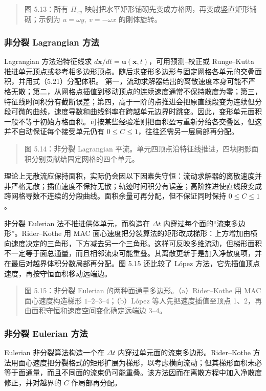 \documentclass[11pt,a4paper,openany,fontset=none]{ctexbook}
\begin{document}
\begin{quote}\small 图 5.13：所有 $\Pi_{xy}$ 映射把水平矩形铺砌先变成方格网，再变成竖直矩形铺砌；示例为 $u=\omega y,\ v=-\omega x$ 的刚体旋转。\end{quote}
\subsubsection{非分裂 Lagrangian 方法}

Lagrangian 方法沿特征线求 $d\bm x/dt=\bm u(\bm x,t)$，可用预测--校正或 Runge--Kutta 推进单元顶点或参考相多边形顶点。随后求变形多边形与固定网格各单元的交叠面积，并用式（5.21）分配体积。%
第一，流动求解器给出的离散速度本身可能不严格无散；第二，从网格点插值到移动顶点的连续速度通常不保持散度为零；第三，特征线时间积分有截断误差；第四，高于一阶的点推进会把原直线段变为连续但分段可微的曲线，速度导数和曲线斜率在跨越单元边界时跳变。因此，变形单元面积一般不等于初始方格面积。可按某些经验准则把面积盈亏重新分给各交叠区，但这并不自动保证每个接受单元仍有 $0\le C\le1$，往往还需另一层局部再分配。

\begin{quote}\small 图 5.14：非分裂 Lagrangian 平流。单元四顶点沿特征线推进，四块阴影面积分别贡献给固定网格的四个单元。\end{quote}
理论上无散流应保持面积，实际仍会因以下因素失守恒：流动求解器的离散速度并非严格无散；插值速度不保持无散；轨迹时间积分有误差；高阶推进使直线段变成跨网格导数不连续的分段曲线。面积余量可再分配，但不保证同时保持 $0\leq C\leq1$。

非分裂 Eulerian 法不推进供体单元，而构造在 $\Delta t$ 内穿过每个面的“流束多边形”。Rider--Kothe 用 MAC 面心速度把分裂算法的矩形改成梯形：上方增加由横向速度决定的三角形，下方减去另一个三角形。这样可反映多维流动，但梯形面积不一定等于面总通量，而且相邻流束可能重叠。其离散更新于是加入净散度项，并在最后对越界体积分数局部再分配。图 5.15 还比较了 López 方法，它先插值顶点速度，再按守恒面积移动远端边。

\begin{quote}\small 图 5.15：非分裂 Eulerian 的两种面通量多边形。（a）Rider--Kothe 用 MAC 面心速度构造梯形 $1$--$2$--$3$--$4$；（b）López 等人先把速度插值至顶点 1、2，再由面积守恒和速度空间变化确定远端边 3--4。\end{quote}
\subsubsection{非分裂 Eulerian 方法}

Eulerian 非分裂算法构造一个在 $\Delta t$ 内穿过单元面的流束多边形。Rider--Kothe 方法用面心速度把分裂格式的矩形扩展为梯形，以考虑横向流动；但其梯形面积未必等于面通量，而且不同面的流束仍可能重叠。该方法因而在离散方程中加入净散度修正，并对越界的 $C$ 作局部再分配。
\end{document}

